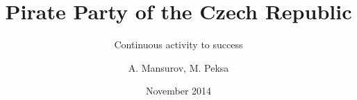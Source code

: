 \documentclass[sans]{beamer}
\begin{document}
	\title{Pirate Party of the Czech Republic}
	\subtitle{Continuous activity to success}
	\author{A. Mansurov, M. Peksa}
	\date{November 2014}
	
	\frame{\titlepage}
	
	
\end{document}
